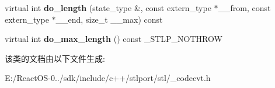 \begin{DoxyCompactItemize}
\item 
\mbox{\label{classcodecvt_aec62855ab93330c37dec181d5431a878}} 
virtual int {\bfseries do\+\_\+length} (state\+\_\+type \&, const extern\+\_\+type $\ast$\+\_\+\+\_\+from, const extern\+\_\+type $\ast$\+\_\+\+\_\+end, size\+\_\+t \+\_\+\+\_\+max) const
\item 
\mbox{\label{classcodecvt_a1677be9ea68c736ffe4fb53969dcddb8}} 
virtual int {\bfseries do\+\_\+max\+\_\+length} () const \+\_\+\+S\+T\+L\+P\+\_\+\+N\+O\+T\+H\+R\+OW
\end{DoxyCompactItemize}


该类的文档由以下文件生成\+:\begin{DoxyCompactItemize}
\item 
E\+:/\+React\+O\+S-\/0../sdk/include/c++/stlport/stl/\+\_\+codecvt.\+h\end{DoxyCompactItemize}
